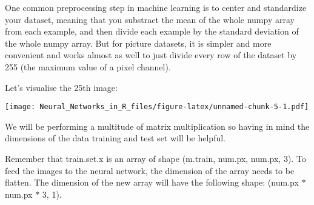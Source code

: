 \documentclass[]{article}
\newenvironment{Shaded}{\begin{snugshade}}{\end{snugshade}}
\newcommand{\KeywordTok}[1]{\textcolor[rgb]{0.13,0.29,0.53}{\textbf{#1}}}
\newcommand{\DataTypeTok}[1]{\textcolor[rgb]{0.13,0.29,0.53}{#1}}
\newcommand{\DecValTok}[1]{\textcolor[rgb]{0.00,0.00,0.81}{#1}}
\newcommand{\StringTok}[1]{\textcolor[rgb]{0.31,0.60,0.02}{#1}}
\newcommand{\OperatorTok}[1]{\textcolor[rgb]{0.81,0.36,0.00}{\textbf{#1}}}
\newcommand{\NormalTok}[1]{#1}
\begin{document}
One common preprocessing step in machine learning is to center and
standardize your dataset, meaning that you substract the mean of the
whole numpy array from each example, and then divide each example by the
standard deviation of the whole numpy array. But for picture datasets,
it is simpler and more convenient and works almost as well to just
divide every row of the dataset by 255 (the maximum value of a pixel
channel).

Let's visualise the 25th image:

\begin{Shaded}
\end{Shaded}

\texttt{[image: Neural\_Networks\_in\_R\_files/figure-latex/unnamed-chunk-5-1.pdf]}

We will be performing a multitude of matrix multiplication so having in
mind the dimensions of the data training and test set will be helpful.

\begin{Shaded}
\end{Shaded}

Remember that train.set.x is an array of shape (m.train, num.px, num.px,
3). To feed the images to the neural network, the dimension of the array
needs to be flatten. The dimension of the new array will have the
following shape: (num.px \(*\) num.px \(*\) 3, 1).
\end{document}
